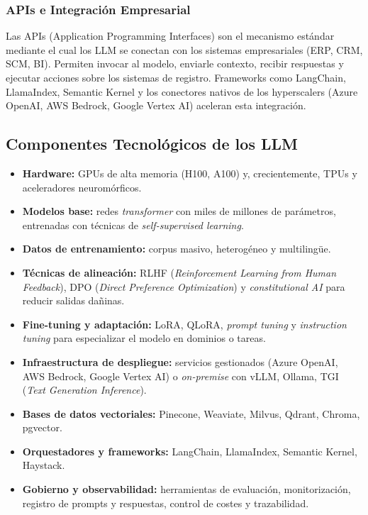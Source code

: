 \documentclass[12pt,a4paper,oneside]{article}
\begin{document}
\subsubsection{APIs e Integración Empresarial}

Las APIs (Application Programming Interfaces) son el mecanismo estándar mediante el cual los LLM se conectan con los sistemas empresariales (ERP, CRM, SCM, BI). Permiten invocar al modelo, enviarle contexto, recibir respuestas y ejecutar acciones sobre los sistemas de registro. Frameworks como LangChain, LlamaIndex, Semantic Kernel y los conectores nativos de los hyperscalers (Azure OpenAI, AWS Bedrock, Google Vertex AI) aceleran esta integración.

\subsection{Componentes Tecnológicos de los LLM}

\begin{itemize}[leftmargin=*]
    \item \textbf{Hardware:} GPUs de alta memoria (H100, A100) y, crecientemente, TPUs y aceleradores neuromórficos.
    \item \textbf{Modelos base:} redes \textit{transformer} con miles de millones de parámetros, entrenadas con técnicas de \textit{self-supervised learning}.
    \item \textbf{Datos de entrenamiento:} corpus masivo, heterogéneo y multilingüe.
    \item \textbf{Técnicas de alineación:} RLHF (\textit{Reinforcement Learning from Human Feedback}), DPO (\textit{Direct Preference Optimization}) y \textit{constitutional AI} para reducir salidas dañinas.
    \item \textbf{Fine-tuning y adaptación:} LoRA, QLoRA, \textit{prompt tuning} y \textit{instruction tuning} para especializar el modelo en dominios o tareas.
    \item \textbf{Infraestructura de despliegue:} servicios gestionados (Azure OpenAI, AWS Bedrock, Google Vertex AI) o \textit{on-premise} con vLLM, Ollama, TGI (\textit{Text Generation Inference}).
    \item \textbf{Bases de datos vectoriales:} Pinecone, Weaviate, Milvus, Qdrant, Chroma, pgvector.
    \item \textbf{Orquestadores y frameworks:} LangChain, LlamaIndex, Semantic Kernel, Haystack.
    \item \textbf{Gobierno y observabilidad:} herramientas de evaluación, monitorización, registro de prompts y respuestas, control de costes y trazabilidad.
\end{itemize}
\end{document}
